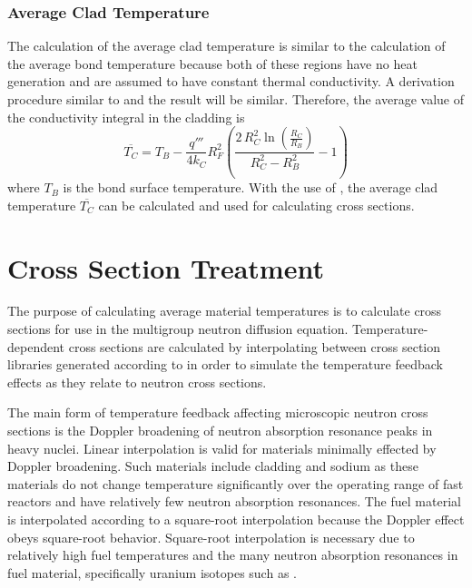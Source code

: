     \subsubsection{Average Clad Temperature}
      The calculation of the average clad temperature is similar to the
      calculation of the average bond temperature because both of these regions
      have no heat generation and are assumed to have constant thermal
      conductivity. A derivation procedure similar to
       and the result will be similar. Therefore,
      the average value of the conductivity integral in the cladding is 
      \begin{equation}
        \label{eq:tc_bar}
        \overline{T_C} = T_B - \frac{q'''}{4 k_C} R_F^2 \left(
          \frac{2 \, R_C^2 \ln\left(\frac{R_C}{R_B}\right)}
          {R_C^2 - R_B^2}  - 1\right)
      \end{equation}
      where $T_B$ is the bond surface temperature. With the use of
      , the average clad temperature $\overline{T_C}$ can be
      calculated and used for calculating cross sections.

\section{Cross Section Treatment}
  The purpose of calculating average material temperatures is to calculate cross
  sections for use in the multigroup neutron diffusion equation.
  Temperature-dependent cross sections are calculated by interpolating between
  cross section libraries generated according to
   in order to simulate the temperature
  feedback effects as they relate to neutron cross sections.

  The main form of temperature feedback affecting microscopic neutron cross
  sections is the Doppler broadening of neutron absorption resonance peaks in
  heavy nuclei. Linear interpolation is valid for materials minimally effected
  by Doppler broadening. Such materials include cladding and sodium as these
  materials do not change temperature significantly over the operating range of
  fast reactors and have relatively few neutron absorption resonances. The fuel
  material is interpolated according to a square-root interpolation because the
  Doppler effect obeys square-root behavior. Square-root interpolation is
  necessary due to relatively high fuel temperatures and the many neutron
  absorption resonances in fuel material, specifically uranium isotopes such as
  .

